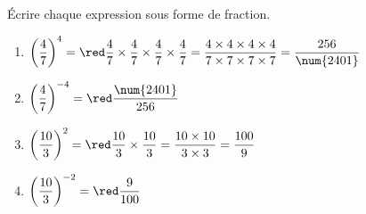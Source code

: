     Écrire chaque expression sous forme de fraction.

    \begin{spacing}{2}
        \begin{enumerate}
            \item $\left(\dfrac{4}{7}\right)^4 =     {\red \dfrac{4}{7}\times \dfrac{4}{7}\times \dfrac{4}{7}\times \dfrac{4}{7} = \dfrac{4\times 4\times 4\times 4}{7\times 7\times 7\times 7}=\dfrac{256}{\num{2401}}}$
            \item $\left(\dfrac{4}{7}\right)^{-4} =  {\red \dfrac{\num{2401}}{256}}$
            \item $\left(\dfrac{10}{3}\right)^2 =    {\red \dfrac{10}{3}\times \dfrac{10}{3} = \dfrac{10\times 10}{3\times 3} = \dfrac{100}{9}}$
            \item $\left(\dfrac{10}{3}\right)^{-2} = {\red \dfrac{9}{100}}$
        \end{enumerate}
    \end{spacing}

